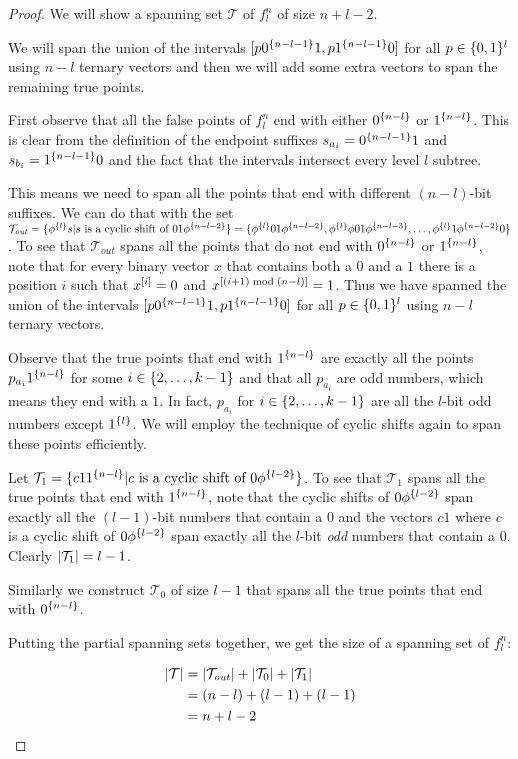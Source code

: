 \begin{proof}
We will show a spanning set $\mathcal{T}$
of $f_l^n$ of size $n+l-2$.

We will span the union of the intervals
$[p 0^{\{n-l-1\}} 1, p 1^{\{n-l-1\}} 0]$
for all $p \in \{0, 1\}^l$
using $n-l$ ternary vectors
and then we will add some extra vectors
to span the remaining true points.

First observe that all the false points of $f_l^n$
end with either $0^{\{n-l\}}$ or $1^{\{n-l\}}$.
This is clear from the definition
of the  endpoint suffixes
$s_{a_i} = 0^{\{n-l-1\}} 1$
and $s_{b_i} = 1^{\{n-l-1\}} 0$
and the fact that the intervals intersect every
level $l$ subtree.

This means we need to span all the points that end
with different $(n-l)$-bit suffixes.
We can do that with the set
$\mathcal{T}_{\mathit{out}}
= \{\phi^{\{l\}} s
| s \text{ is a cyclic shift of } 01 \phi^{\{n-l-2\}}\}
= \{
\phi^{\{l\}} 01 \phi^{\{n-l-2\}},
\phi^{\{l\}} \phi 01 \phi^{\{n-l-3\}},
\ldots,
\phi^{\{l\}} 1 \phi^{\{n-l-2\}} 0
\}
$.
To see that $\mathcal{T}_{\mathit{out}}$
spans all the points
that do not end with $0^{\{n-l\}}$ or $1^{\{n-l\}}$,
note that for every binary vector $x$
that contains both a $0$ and a $1$
there is a position $i$
such that $x^{[i]} = 0$
and $x^{[(i+1) \bmod (n-l)]} = 1$.
Thus we have spanned the union of the intervals
$[p 0^{\{n-l-1\}} 1, p 1^{\{n-l-1\}} 0]$
for all $p \in \{0, 1\}^l$
using $n-l$ ternary vectors.

Observe that
the true points
that end with $1^{\{n-l\}}$
are exactly all the points $p_{a_i} 1^{\{n-l\}}$
for some $i \in \{2, \ldots, k-1\}$
and that all $p_{a_i}$ are odd numbers,
which means they end with a $1$.
In fact,
$p_{a_i}$ for $i \in \{2, \ldots, k-1\}$
are all the $l$-bit odd numbers except $1^{\{l\}}$.
We will employ the technique of cyclic shifts
again
to span these points efficiently.

Let $\mathcal{T}_1 = \{c 1 1^{\{n-l\}}
| c \text{ is a cyclic shift of } 0 \phi^{\{l-2\}}\}$.
To see that $\mathcal{T}_1$ spans all the true points
that end with $1^{\{n-l\}}$,
note that the cyclic shifts of $0 \phi^{\{l-2\}}$
span exactly all the $(l-1)$-bit numbers that contain a $0$
and the vectors $c 1$
where $c$ is a cyclic shift of $0 \phi^{\{l-2\}}$
span exactly all the $l$-bit \emph{odd} numbers
that contain a $0$.
Clearly $\lvert\mathcal{T}_1\rvert = l-1$.

Similarly we construct $\mathcal{T}_0$ of size $l-1$
that spans all the true points
that end with $0^{\{n-l\}}$.

Putting the partial spanning sets together,
we get the size of a spanning set of $f_l^n$:

\begin{align*}
\lvert\mathcal{T}\rvert
&= \lvert\mathcal{T}_{\mathit{out}}\rvert
+ \lvert\mathcal{T}_0\rvert + \lvert\mathcal{T}_1\rvert \\
&= (n-l) + (l-1) + (l-1) \\
&= n + l - 2
\end{align*}
\end{proof}

